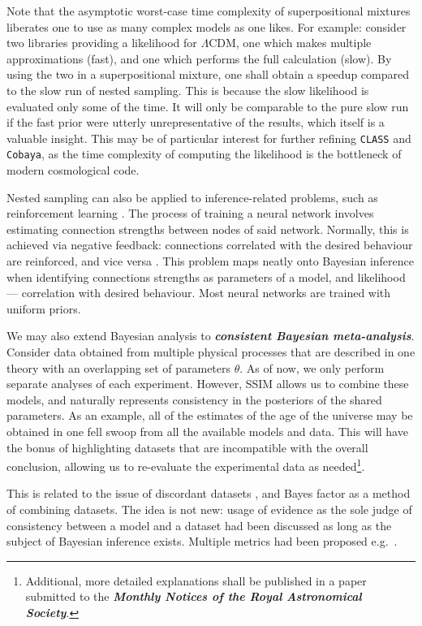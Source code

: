 \documentclass[usenatbib]{mnras}
\begin{document}
Note that the asymptotic worst-case time complexity of superpositional
mixtures liberates one to use as many complex models as one likes. For
example: consider two libraries providing a likelihood for
\(\Lambda\)CDM, one which makes multiple approximations (fast), and
one which performs the full calculation (slow). By using the two in a
superpositional mixture, one shall obtain a speedup compared to the
slow run of nested sampling. This is because the slow likelihood is
evaluated only some of the time. It will only be comparable to the
pure slow run if the fast prior were utterly unrepresentative of the
results, which itself is a valuable insight. This may be of particular
interest for further refining \texttt{CLASS} and \texttt{Cobaya}, as
the time complexity of computing the likelihood is the bottleneck of
modern cosmological code.

Nested sampling can also be applied to inference-related problems,
such as reinforcement learning \citep{javid2020}. The process of
training a neural network involves estimating connection strengths
between nodes of said network. Normally, this is achieved via negative
feedback: connections correlated with the desired behaviour are
reinforced, and vice versa \citep{Kaelbling_1996}. This problem maps
neatly onto Bayesian inference when identifying connections strengths
as parameters of a model, and likelihood --- correlation with desired
behaviour. Most neural networks are trained with uniform priors.


We may also extend Bayesian analysis to \textbf{\emph{consistent
    Bayesian meta-analysis}}. Consider data obtained from multiple
physical processes that are described in one theory with an
overlapping set of parameters $\theta$. As of now, we only perform
separate analyses of each experiment. However, SSIM allows us to
combine these models, and naturally represents consistency in the
posteriors of the shared parameters. As an example, all of the
estimates of the age of the universe may be obtained in one fell swoop
from all the available models and data. This will have the bonus of
highlighting datasets that are incompatible with the overall
conclusion, allowing us to re-evaluate the experimental data as
needed\footnote{Additional, more detailed explanations shall be
  published in a paper submitted to the \textbf{\emph{Monthly Notices
      of the Royal Astronomical Society}}.}.

This is related to the issue of discordant datasets \citep{tension},
and Bayes factor as a method of combining datasets. The idea is not
new: usage of evidence as the sole judge of consistency between a
model and a dataset had been discussed as long as the subject of
Bayesian inference exists. Multiple metrics had been proposed
e.g.~\cite{Marshall_2006}.
\end{document}
